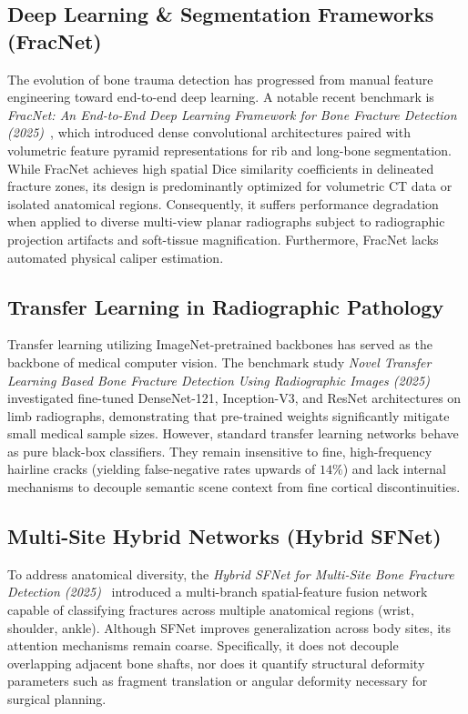 \documentclass[journal]{IEEEtran}
\begin{document}
\subsection{Deep Learning \& Segmentation Frameworks (FracNet)}
The evolution of bone trauma detection has progressed from manual feature engineering toward end-to-end deep learning. A notable recent benchmark is \textit{FracNet: An End-to-End Deep Learning Framework for Bone Fracture Detection (2025)}~\cite{fracnet2025}, which introduced dense convolutional architectures paired with volumetric feature pyramid representations for rib and long-bone segmentation. While FracNet achieves high spatial Dice similarity coefficients in delineated fracture zones, its design is predominantly optimized for volumetric CT data or isolated anatomical regions. Consequently, it suffers performance degradation when applied to diverse multi-view planar radiographs subject to radiographic projection artifacts and soft-tissue magnification. Furthermore, FracNet lacks automated physical caliper estimation.

\subsection{Transfer Learning in Radiographic Pathology}
Transfer learning utilizing ImageNet-pretrained backbones has served as the backbone of medical computer vision. The benchmark study \textit{Novel Transfer Learning Based Bone Fracture Detection Using Radiographic Images (2025)}~\cite{noveltransfer2025} investigated fine-tuned DenseNet-121, Inception-V3, and ResNet architectures on limb radiographs, demonstrating that pre-trained weights significantly mitigate small medical sample sizes. However, standard transfer learning networks behave as pure black-box classifiers. They remain insensitive to fine, high-frequency hairline cracks (yielding false-negative rates upwards of $14\%$) and lack internal mechanisms to decouple semantic scene context from fine cortical discontinuities.

\subsection{Multi-Site Hybrid Networks (Hybrid SFNet)}
To address anatomical diversity, the \textit{Hybrid SFNet for Multi-Site Bone Fracture Detection (2025)}~\cite{sfnet2025} introduced a multi-branch spatial-feature fusion network capable of classifying fractures across multiple anatomical regions (wrist, shoulder, ankle). Although SFNet improves generalization across body sites, its attention mechanisms remain coarse. Specifically, it does not decouple overlapping adjacent bone shafts, nor does it quantify structural deformity parameters such as fragment translation or angular deformity necessary for surgical planning.
\end{document}
